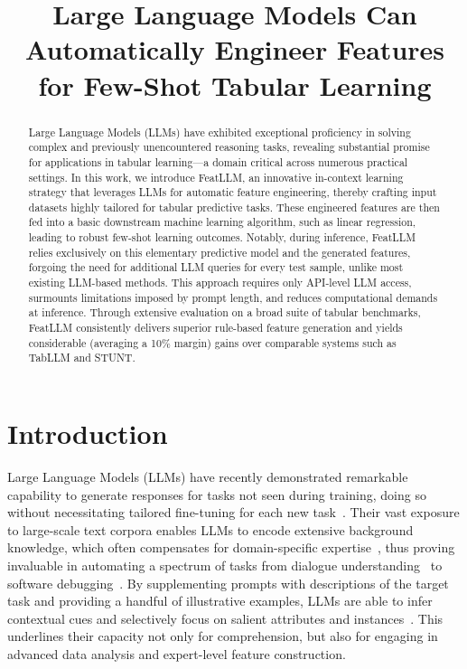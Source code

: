 \title{Large Language Models Can Automatically Engineer Features for Few-Shot Tabular Learning}

\begin{abstract}
Large Language Models (LLMs) have exhibited exceptional proficiency in solving complex and previously unencountered reasoning tasks, revealing substantial promise for applications in tabular learning—a domain critical across numerous practical settings. In this work, we introduce \textsf{FeatLLM}, an innovative in-context learning strategy that leverages LLMs for automatic feature engineering, thereby crafting input datasets highly tailored for tabular predictive tasks. These engineered features are then fed into a basic downstream machine learning algorithm, such as linear regression, leading to robust few-shot learning outcomes. Notably, during inference, \textsf{FeatLLM} relies exclusively on this elementary predictive model and the generated features, forgoing the need for additional LLM queries for every test sample, unlike most existing LLM-based methods. This approach requires only API-level LLM access, surmounts limitations imposed by prompt length, and reduces computational demands at inference. Through extensive evaluation on a broad suite of tabular benchmarks, \textsf{FeatLLM} consistently delivers superior rule-based feature generation and yields considerable (averaging a 10\% margin) gains over comparable systems such as TabLLM and STUNT.
\end{abstract}

\section{Introduction}
Large Language Models (LLMs) have recently demonstrated remarkable capability to generate responses for tasks not seen during training, doing so without necessitating tailored fine-tuning for each new task~\cite{creswell2022selection,imani2023mathprompter,taylor2022galactica}. Their vast exposure to large-scale text corpora enables LLMs to encode extensive background knowledge, which often compensates for domain-specific expertise~\cite{Genomes2021,singhal2023large,wilcox2003role}, thus proving invaluable in automating a spectrum of tasks from dialogue understanding~\cite{finch2023leveraging} to software debugging~\cite{fan2023automated}. By supplementing prompts with descriptions of the target task and providing a handful of illustrative examples, LLMs are able to infer contextual cues and selectively focus on salient attributes and instances~\cite{brown2020language,zhao2023survey}. This underlines their capacity not only for comprehension, but also for engaging in advanced data analysis and expert-level feature construction.

